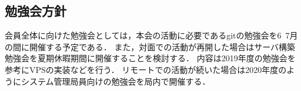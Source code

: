 \subsection*{勉強会方針}


会員全体に向けた勉強会としては，本会の活動に必要であるgitの勉強会を6~7月の間に開催する予定である．
また，対面での活動が再開した場合はサーバ構築勉強会を夏期休暇期間に開催することを検討する．
内容は2019年度の勉強会を参考にVPSの実装などを行う．
リモートでの活動が続いた場合は2020年度のようにシステム管理局員向けの勉強会を局内で開催する．


